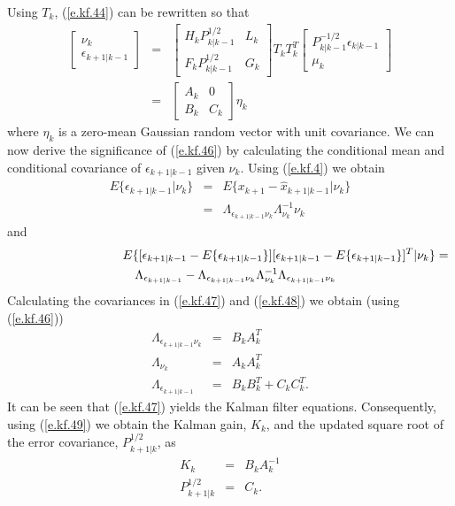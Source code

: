 	Using $T_k$, (\ref{e.kf.44}) can be rewritten so that
%
\begin{eqnarray}
\left[\begin{array}{c}\nu_k\\\epsilon_{k+1|k-1}\end{array}\right]
&=&
  \left[\begin{array}{cc}H_kP_{k|k-1}^{1/2}&L_k\\
                         F_kP_{k|k-1}^{1/2}&G_k\end{array}\right]T_kT_k^T
\left[\begin{array}{c}P_{k|k-1}^{-1/2}\epsilon_{k|k-1}\\\mu_k\end{array}\right]
\nonumber\\
&=&
  \left[\begin{array}{cc}A_k&0\\
                         B_k&C_k\end{array}\right]\eta_k
\label{e.kf.46}
\end{eqnarray}
%
where $\eta_k$ is a zero-mean Gaussian random vector with unit
covariance.  We can now derive the
significance of (\ref{e.kf.46}) by calculating the
conditional mean and conditional covariance of $\epsilon_{k+1|k-1}$
given $\nu_k$.  Using (\ref{e.kf.4}) we obtain
%
\begin{eqnarray}
E\{\epsilon_{k+1|k-1}|\nu_k\}&=&E\{x_{k+1}-\hat{x}_{k+1|k-1}|\nu_k\}\nonumber\\
&=&\Lambda_{\epsilon_{k+1|k-1}\nu_k}\Lambda_{\nu_k}^{-1}\nu_k
\label{e.kf.47}
\end{eqnarray}
%
and
%
\begin{eqnarray}
\lefteqn{E\{[\epsilon_{k+1|k-1}-E\{\epsilon_{k+1|k-1}\}][\epsilon_{k+1|k-1}-E\{\epsilon_{k+1|k-1}\}]^T|\nu_k\}=}\nonumber\\
&&\Lambda_{\epsilon_{k+1|k-1}}-\Lambda_{\epsilon_{k+1|k-1}\nu_k}\Lambda_{\nu_k}^{-1}\Lambda_{\epsilon_{k+1|k-1}\nu_k}
\label{e.kf.48}
\end{eqnarray}
%
Calculating the covariances in (\ref{e.kf.47}) and (\ref{e.kf.48}) we
obtain (using (\ref{e.kf.46}))
%
\begin{eqnarray}
\Lambda_{\epsilon_{k+1|k-1}\nu_k}&=&B_kA_k^T\nonumber\\
\Lambda_{\nu_k}&=&A_kA_k^T\nonumber\\
\Lambda_{\epsilon_{k+1|k-1}}&=&B_kB_k^T+C_kC_k^T.
\label{e.kf.49}
\end{eqnarray}
%
It can be seen that (\ref{e.kf.47}) yields the Kalman filter equations.
Consequently, using (\ref{e.kf.49}) we obtain the Kalman
gain, $K_k$, and the updated square root of the error covariance,
$P_{k+1|k}^{1/2}$, as
%
\begin{eqnarray}
K_k&=&B_kA_k^{-1}\nonumber\\
P_{k+1|k}^{1/2}&=&C_k.
\label{e.kf.50}
\end{eqnarray}
%


